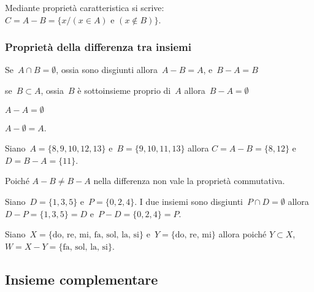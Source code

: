 \begin{center}

\end{center}
Mediante proprietà caratteristica si 
scrive:~$C=A-B=\{x/(x\in A)\text{ e }(x\notin B)\}$.

\subsubsection{Proprietà della differenza tra insiemi}

\begin{enumeratea}
\item Se~$A\cap B=\emptyset $, ossia sono disgiunti allora~$A-B=A$, e~$B-A=B$
\item se~$B\subset A$, ossia~$B$ è sottoinsieme proprio 
 di~$A$ allora~$B-A=\emptyset $
\item $A-A=\emptyset$
\item $A-\emptyset =A$.
\end{enumeratea}

\begin{exrig}
 \begin{esempio}
Siano~$A=\{8, 9, 10, 12, 13\}$ e~$B=\{9, 10, 11, 13\}$ allora
$C=A-B=\{8, 12\}$ e~$D=B-A=\{11\}$.
 \end{esempio}
\end{exrig}

Poiché $A-B\neq B-A$ nella differenza non vale la proprietà
commutativa.

\begin{exrig}
 \begin{esempio}
Siano~$D=\{1, 3, 5\}$ e~$P=\{0, 2, 4\}$. I due insiemi sono 
disgiunti~$P\cap D=\emptyset$ allora~$D-P=\{1,3,5\}=D$ e~$P-D=\{0,2,4\}=P$.
\begin{center}
 
\end{center}
 \end{esempio}

 \begin{esempio}
Siano~$X=\{\text{do, re, mi, fa, sol, la, si}\}$
e~$Y=\{\text{do, re, mi}\}$ allora poiché
$Y\subset X$, $W=X-Y=\{\text{fa, sol, la, si}\}$.
\begin{center}
 
\end{center}
 \end{esempio}
\end{exrig}


\subsection{Insieme complementare}
\label{subsec:op_complementare}

